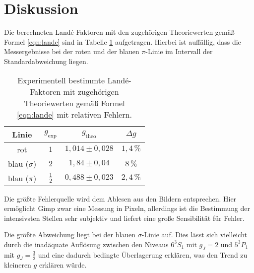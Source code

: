 \section{Diskussion}
\label{sec:Diskussion}
Die berechneten Landé-Faktoren mit den zugehörigen Theoriewerten gemäß Formel \eqref{eqn:lande}
sind in Tabelle \ref{tab:result} aufgetragen.
Hierbei ist auffällig, dass die Messergebnisse bei der roten und der blauen $\pi$-Linie
im Intervall der Standardabweichung liegen.
\begin{table}
	\centering
	\caption{Experimentell bestimmte Landé-Faktoren mit zugehörigen Theoriewerten gemäß Formel \eqref{eqn:lande} mit relativen Fehlern.} 
	 \label{tab:result}
	 \begin{tabular}{c | c | c | c}
	 	\toprule
		 Linie & $g_{\text{exp}}$ & $g_{\text{theo}}$ & $\Delta g$ \\
		\midrule
		rot & $1$ & $1,014\pm0,028$ & $1,4\, \si{\percent}$ \\
		blau ($\sigma$) & $2$ & $1,84\pm0,04$ & $8 \, \si{\percent}$ \\
		blau ($\pi$)    & $\frac{1}{2}$ & $0,488\pm0,023$ & $2,4\,\si{\percent}$ \\
		\bottomrule
	\end{tabular}
\end{table}
Die größte Fehlerquelle wird dem Ablesen aus den Bildern entsprechen. Hier ermöglicht
Gimp \cite{gimp} zwar eine Messung in Pixeln, allerdings ist die Bestimmung der intensivsten
Stellen sehr subjektiv und liefert eine große Sensibilität für Fehler.

Die größte Abweichung liegt bei der blauen $\sigma$-Linie auf. Dies lässt sich vielleicht durch
die inadäquate Auflösung zwischen den Niveaus $6^3S_1$ mit $g_J=2$ und $5^3P_1$ mit $g_J=\frac{3}{2}$ und eine dadurch bedingte Überlagerung erklären, was den Trend zu kleineren $g$ erklären würde.
